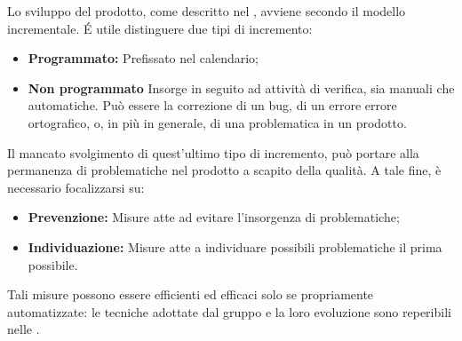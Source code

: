 Lo sviluppo del prodotto, come descritto nel \PdP , avviene secondo il {modello incrementale}. \'E utile distinguere due tipi di incremento:
\begin{itemize}
	\item \textbf{Programmato:} Prefissato nel calendario;
	\item \textbf{Non programmato} Insorge in seguito ad attività di verifica, sia manuali che automatiche. Può essere la correzione di un {bug}, di un errore errore ortografico, o, in più in generale, di una problematica in un prodotto.
\end{itemize}
Il mancato svolgimento di quest'ultimo tipo di incremento, può portare alla permanenza di problematiche nel prodotto a scapito della qualità. A tale fine, è necessario focalizzarsi su:
\begin{itemize}
	\item \textbf{Prevenzione:} Misure atte ad evitare l'insorgenza di problematiche;
	\item \textbf{Individuazione:} Misure atte a individuare possibili problematiche il prima possibile.
\end{itemize}
Tali misure possono essere {efficienti} ed {efficaci} solo se propriamente automatizzate: le tecniche adottate dal gruppo \gruppo \space e la loro evoluzione sono reperibili nelle \NdP . 
 
